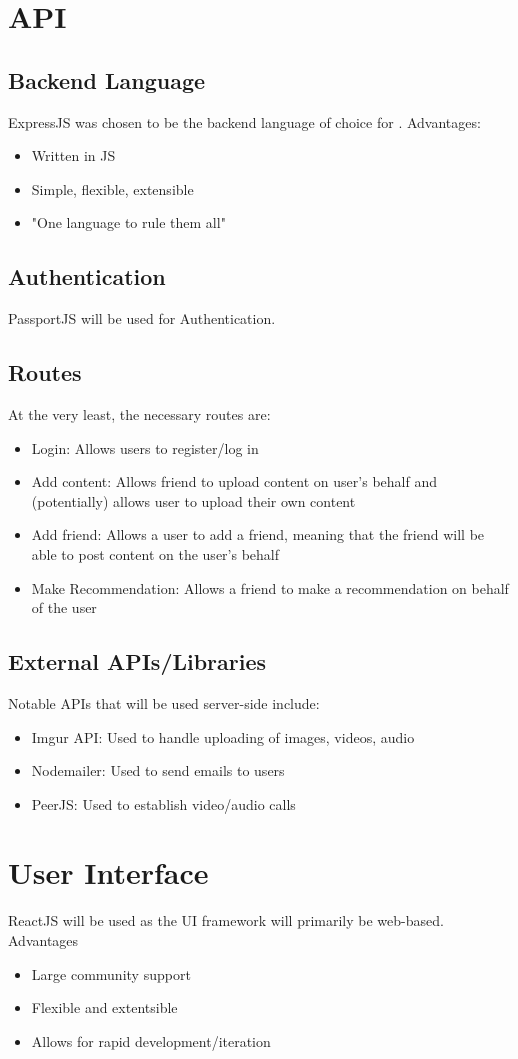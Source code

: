 \section{API}
\subsection{Backend Language}
ExpressJS was chosen to be the backend language of choice for \serviceName. 
Advantages:
\begin{itemize}
    \item Written in JS
    \item Simple, flexible, extensible
    \item "One language to rule them all"
\end{itemize}

\subsection{Authentication}
PassportJS will be used for Authentication.

\subsection{Routes}
At the very least, the necessary routes are:
\begin{itemize}
    \item Login: Allows users to register/log in
    \item Add content: Allows friend to upload content on user's behalf and (potentially) allows user to upload their own content
    \item Add friend: Allows a user to add a friend, meaning that the friend will be able to post content on the user's behalf
    \item Make Recommendation: Allows a friend to make a recommendation on behalf of the user
\end{itemize}


\subsection{External APIs/Libraries}
Notable APIs that will be used server-side include:
\begin{itemize}
    \item Imgur API: Used to handle uploading of images, videos, audio
    \item Nodemailer: Used to send emails to users
    \item PeerJS: Used to establish video/audio calls
\end{itemize}


\section{User Interface}
ReactJS will be used as the UI framework \serviceName will primarily be web-based. 
Advantages
\begin{itemize}
    \item Large community support
    \item Flexible and extentsible
    \item Allows for rapid development/iteration
\end{itemize}
